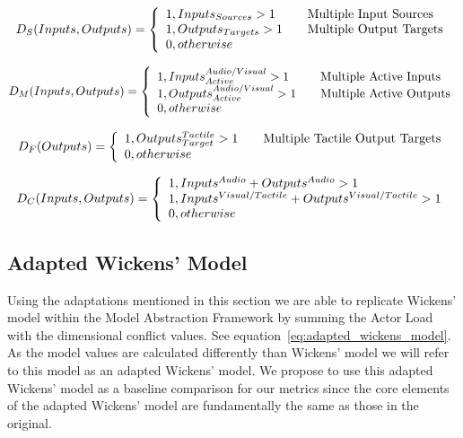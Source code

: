 \begin{equation}
D_{S}(Inputs, Outputs) = \left\{ 
  \begin{array}{l l}
    1, Inputs_{Sources} > 1 & \quad \text{Multiple Input Sources}\\
    1, Outputs_{Targets} > 1 & \quad \text{Multiple Output Targets}\\
    0, otherwise
  \end{array}
  \right.
  \label{eq:stage_dimension}
\end{equation}

\begin{equation}
D_{M}(Inputs, Outputs) = \left\{ 
  \begin{array}{l l}
    1, Inputs_{Active}^{Audio/Visual} > 1 & \quad \text{Multiple Active Inputs}\\
    1, Outputs_{Active}^{Audio/Visual} > 1 & \quad \text{Multiple Active Outputs}\\
    0, otherwise
  \end{array}
  \right.
  \label{eq:modality_dimension}
\end{equation}

\begin{equation}
D_{F}(Outputs) = \left\{ 
  \begin{array}{l l}
    1, Outputs_{Target}^{Tactile} > 1 & \quad \text{Multiple Tactile Output Targets}\\
    0, otherwise
  \end{array}
  \right.
  \label{eq:focus_dimension}
\end{equation}

\begin{equation}
D_{C}(Inputs, Outputs) = \left\{ 
  \begin{array}{l l}
    1, Inputs^{Audio} + Outputs^{Audio} > 1\\
    1, Inputs^{Visual/Tactile} + Outputs^{Visual/Tactile} > 1\\
    0, otherwise
  \end{array}
  \right.
  \label{eq:codes_dimension}
\end{equation}


\subsection{Adapted Wickens' Model}
Using the adaptations mentioned in this section we are able to replicate Wickens' model within the Model Abstraction Framework by summing the Actor Load with the dimensional conflict values.  See equation~\ref{eq:adapted_wickens_model}.  As the model values are calculated differently than Wickens' model we will refer to this model as an adapted Wickens' model.  We propose to use this adapted Wickens' model as a baseline comparison for our metrics since the core elements of the adapted Wickens' model are fundamentally the same as those in the original.  

